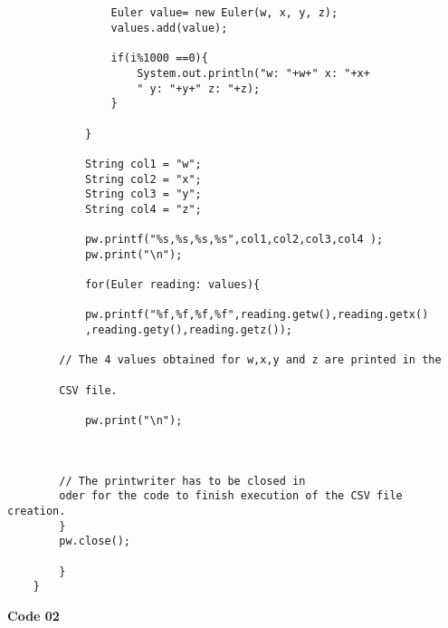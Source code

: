 \begin{framed}
\begin{verbatim}
            
    
                Euler value= new Euler(w, x, y, z);
                values.add(value);
    
                if(i%1000 ==0){
                    System.out.println("w: "+w+" x: "+x+
                    " y: "+y+" z: "+z);
                }

            }

            String col1 = "w";
            String col2 = "x";
            String col3 = "y";
            String col4 = "z";
            
            pw.printf("%s,%s,%s,%s",col1,col2,col3,col4 ); 
            pw.print("\n");
            
            for(Euler reading: values){

            pw.printf("%f,%f,%f,%f",reading.getw(),reading.getx()
            ,reading.gety(),reading.getz());

        // The 4 values obtained for w,x,y and z are printed in the
        
        CSV file.

            pw.print("\n");


            
        // The printwriter has to be closed in 
        oder for the code to finish execution of the CSV file creation.
        }
        pw.close();
    
        }
    }
\end{verbatim}
\end{framed}

\textbf{\Large Code 02}\\

